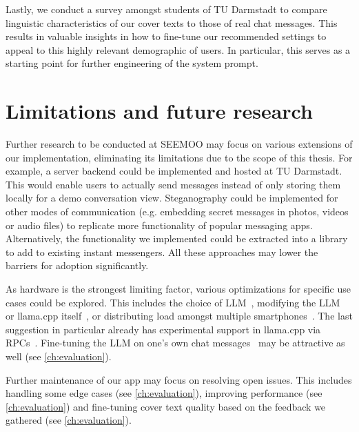 Lastly, we conduct a survey amongst students of TU Darmstadt to compare linguistic characteristics of our cover texts to those of real chat messages. This results in valuable insights in how to fine-tune our recommended settings to appeal to this highly relevant demographic of users. In particular, this serves as a starting point for further engineering of the system prompt.

\section{Limitations and future research}
\label{sec:limitationsAndFutureResearch}
Further research to be conducted at SEEMOO may focus on various extensions of our implementation, eliminating its limitations due to the scope of this thesis. For example, a server backend could be implemented and hosted at TU Darmstadt. This would enable users to actually send messages instead of only storing them locally for a demo conversation view. Steganography could be implemented for other modes of communication (e.g. embedding secret messages in photos, videos or audio files) to replicate more functionality of popular messaging apps. Alternatively, the functionality we implemented could be extracted into a library to add to existing instant messengers. All these approaches may lower the barriers for adoption significantly.

As hardware is the strongest limiting factor, various optimizations for specific use cases could be explored. This includes the choice of \gls{LLM}~\cite{eldanTinyStoriesHowSmall2023}, modifying the \gls{LLM}~\cite{carreiraRevolutionizingMobileInteraction2023} or llama.cpp itself~\cite{chenOptimizationArmv9Architecture2024}, or distributing load amongst multiple smartphones~\cite{zhaoLinguaLinkedDistributedLarge2023}. The last suggestion in particular already has experimental support in llama.cpp via \glspl{RPC}~\cite{gerganovGgerganovLlamacpp2024}. Fine-tuning the \gls{LLM} on one's own chat messages~\cite{donnerSimulationMeFinetuning2024} may be attractive as well (see \cref{ch:evaluation}).

Further maintenance of our app may focus on resolving open issues. This includes handling some edge cases (see \cref{ch:evaluation}), improving performance (see \cref{ch:evaluation}) and fine-tuning cover text quality based on the feedback we gathered (see \cref{ch:evaluation}).
